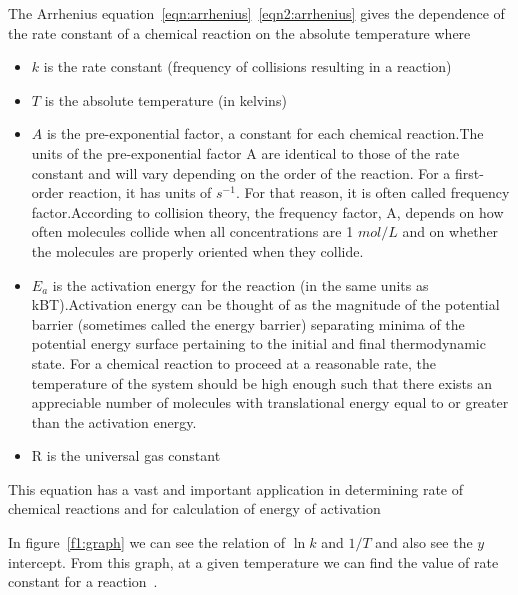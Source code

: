 The Arrhenius equation~\ref{eqn:arrhenius}~\ref{eqn2:arrhenius} gives the dependence of the rate constant of a chemical reaction on the absolute temperature where 
\begin{itemize}
	\item $k$ is the rate constant (frequency of collisions resulting in a reaction)
	\item $T$ is the absolute temperature (in kelvins)
	\item $A$ is the pre-exponential factor, a constant for each chemical reaction.The units of the pre-exponential factor A are identical to those of the rate constant and will vary depending on the order of the reaction. For a first-order reaction, it has units of $s^{-1}$. For that reason, it is often called frequency factor.According to collision theory, the frequency factor, A, depends on how often molecules collide when all concentrations are 1 $mol/L$ and on whether the molecules are properly oriented when they collide.
	\item $E_a$ is the activation energy for the reaction (in the same units as kBT).Activation energy can be thought of as the magnitude of the potential barrier (sometimes called the energy barrier) separating minima of the potential energy surface pertaining to the initial and final thermodynamic state. For a chemical reaction to proceed at a reasonable rate, the temperature of the system should be high enough such that there exists an appreciable number of molecules with translational energy equal to or greater than the activation energy.
	\item R is the universal gas constant

\end{itemize}

This equation has a vast and important application in determining rate of chemical reactions and for calculation of energy of activation~\cite{bohn}

In figure~\ref{f1:graph} we can see the relation of $\ln{k}$ and $1/T$ and also see the $y$ intercept. From this graph, at a given temperature we can find the value of rate constant for a reaction~\cite{fabrikant}.




%
%



%